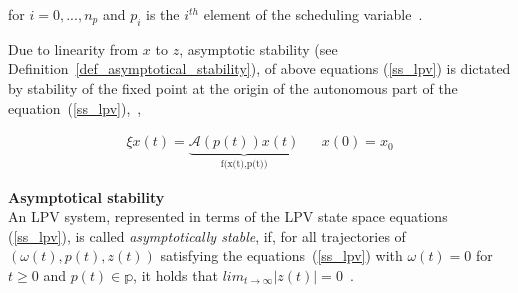 for $i = 0,...,n_p$ and $p_i$ is the $i^{th}$ element of the scheduling variable~\citep{cox2018affine}. %

Due to linearity from $x$ to $z$, asymptotic stability (see Definition~\ref{def_asymptotical_stability}), of above equations (\ref{ss_lpv}) is dictated by stability of the fixed point at the origin of the autonomous part of the equation~(\ref{ss_lpv}),~\ie ,

\begin{align}
	\xi x(t) = \underbrace{\mathcal{A}(p(t))x(t)}_\text{f(x(t),p(t))} & & 
	x(0) = x_0
\end{align}

 \textbf{Asymptotical stability} \label{def_asymptotical_stability} \\
An LPV system, represented in terms of the LPV state space equations (\ref{ss_lpv}), is called \textit{asymptotically stable}, if, for all trajectories of $(\omega(t), p(t), z(t))$ satisfying the equations~(\ref{ss_lpv}) with $\omega(t) = 0$ for $t \geq 0$ and $p(t) \in \mathbb{p}$, it holds that $lim_{t \rightarrow \infty} |z(t)| = 0$~\citep{cox2018affine}.